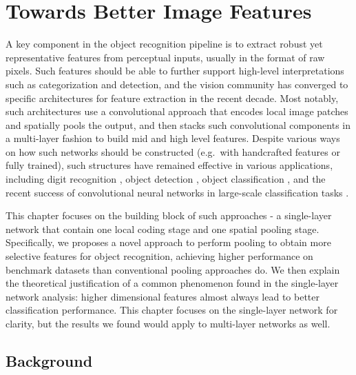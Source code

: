 \chapter{Towards Better Image Features}

A key component in the object recognition pipeline is to extract robust yet representative features from perceptual inputs, usually in the format of raw pixels. Such features should be able to further support high-level interpretations such as categorization and detection, and the vision community has converged to specific architectures for feature extraction in the recent decade. Most notably, such architectures use a convolutional approach that encodes local image patches and spatially pools the output, and then stacks such convolutional components in a multi-layer fashion to build mid and high level features. Despite various ways on how such networks should be constructed (e.g.\ with handcrafted features or fully trained), such structures have remained effective in various applications, including digit recognition \cite{lecun1998gradient}, object detection \cite{Dalal:2005to}, object classification \cite{Yang:2009vb}, and the recent success of convolutional neural networks in large-scale classification tasks \cite{krizhevsky2012imagenet}.

This chapter focuses on the building block of such approaches - a single-layer network that contain one local coding stage and one spatial pooling stage. Specifically, we proposes a novel approach to perform pooling to obtain more selective features for object recognition, achieving higher performance on benchmark datasets than conventional pooling approaches do. We then explain the theoretical justification of a common phenomenon found in the single-layer network analysis: higher dimensional features almost always lead to better classification performance. This chapter focuses on the single-layer network for clarity, but the results we found would apply to multi-layer networks as well.

\section{Background}

